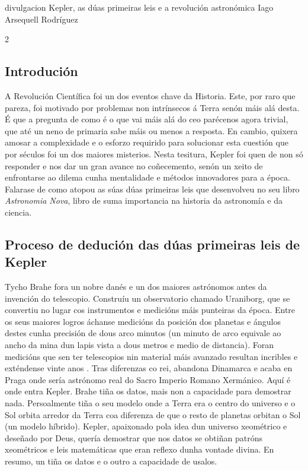 \Titular%
{divulgacion}%
{Kepler, as dúas primeiras leis e a revolución astronómica}%
{Iago Arsequell Rodríguez}%
{}%

\begin{multicols}{2}

\subsection*{Introdución}

A Revolución Científica foi un dos eventos chave da Historia. Este, por raro
que pareza, foi motivado por problemas non intrínsecos á Terra senón máis alá
desta. É que a pregunta de como é o que vai máis alá do ceo parécenos agora
trivial, que até un neno de primaria sabe máis ou menos a resposta. En cambio,
quixera amosar a complexidade e o esforzo requirido para solucionar esta
cuestión que por séculos foi un dos maiores misterios. Nesta tesitura, Kepler
foi quen de non só responder e nos dar un gran avance no coñecemento, senón un
xeito de enfrontarse ao dilema cunha mentalidade e métodos innovadores para a
época. Falarase de como atopou as súas dúas primeiras leis que desenvolveu no
seu libro \textit{Astronomia Nova}, libro de suma importancia na historia da
astronomía e da ciencia.

\subsection*{Proceso de dedución das dúas primeiras leis de Kepler}

Tycho Brahe fora un nobre danés e un dos maiores astrónomos antes da invención
do telescopio. Construíu un observatorio chamado Uraniborg, que se convertiu no
lugar cos instrumentos e medicións máis punteiras da época. Entre os seus
maiores logros áchanse medicións da posición dos planetas e ángulos destes
cunha precisión de dous arco minutos (un minuto de arco equivale ao ancho da
mina dun lapis vista a dous metros e medio de distancia). Foran medicións que
sen ter telescopios nin material máis avanzado resultan incribles e exténdense
vinte anos . Tras diferenzas co rei, abandona Dinamarca e acaba en Praga onde
sería astrónomo real do Sacro Imperio Romano Xermánico. Aquí é onde entra
Kepler. Brahe tiña os datos, mais non a capacidade para demostrar nada.
Persoalmente   tiña o seu modelo onde a Terra era o centro do universo e o Sol
orbita arredor da Terra coa diferenza de que o resto de planetas orbitan o Sol
(un modelo híbrido). Kepler, apaixonado pola idea dun universo xeométrico e
deseñado por Deus, quería demostrar que nos datos se obtiñan patróns
xeométricos e leis matemáticas que eran reflexo dunha vontade divina. En
resumo, un tiña os datos e o outro a capacidade de usalos.


\end{multicols}
